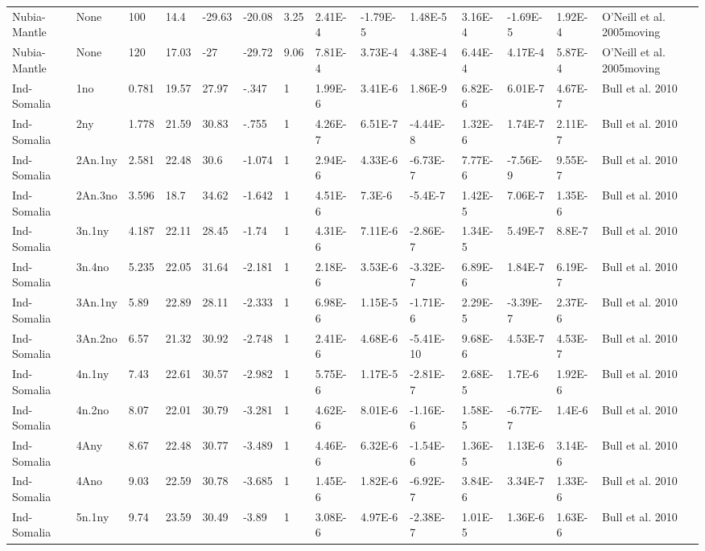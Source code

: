 \begin{landscape}
\begin{longtable}{@{}lllllllllllll>{\scriptsize}p{3.1cm}@{}}
Nubia-Mantle & None & 100 & 14.4 & -29.63 & -20.08 & 3.25 & 2.41E-4 & -1.79E-5 & 1.48E-5 & 3.16E-4 & -1.69E-5 & 1.92E-4 & O'Neill et al. 2005moving \\
Nubia-Mantle & None & 120 & 17.03 & -27 & -29.72 & 9.06 & 7.81E-4 & 3.73E-4 & 4.38E-4 & 6.44E-4 & 4.17E-4 & 5.87E-4 & O'Neill et al. 2005moving \\
Ind-Somalia & 1no & 0.781 & 19.57 & 27.97 & -.347 & 1 & 1.99E-6 & 3.41E-6 & 1.86E-9 & 6.82E-6 & 6.01E-7 & 4.67E-7 & Bull et al. 2010 \\
Ind-Somalia & 2ny & 1.778 & 21.59 & 30.83 & -.755 & 1 & 4.26E-7 & 6.51E-7 & -4.44E-8 & 1.32E-6 & 1.74E-7 & 2.11E-7 & Bull et al. 2010 \\
Ind-Somalia & 2An.1ny & 2.581 & 22.48 & 30.6 & -1.074 & 1 & 2.94E-6 & 4.33E-6 & -6.73E-7 & 7.77E-6 & -7.56E-9 & 9.55E-7 & Bull et al. 2010 \\
Ind-Somalia & 2An.3no & 3.596 & 18.7 & 34.62 & -1.642 & 1 & 4.51E-6 & 7.3E-6 & -5.4E-7 & 1.42E-5 & 7.06E-7 & 1.35E-6 & Bull et al. 2010 \\
Ind-Somalia & 3n.1ny & 4.187 & 22.11 & 28.45 & -1.74 & 1 & 4.31E-6 & 7.11E-6 & -2.86E-7 & 1.34E-5 & 5.49E-7 & 8.8E-7 & Bull et al. 2010 \\
Ind-Somalia & 3n.4no & 5.235 & 22.05 & 31.64 & -2.181 & 1 & 2.18E-6 & 3.53E-6 & -3.32E-7 & 6.89E-6 & 1.84E-7 & 6.19E-7 & Bull et al. 2010 \\
Ind-Somalia & 3An.1ny & 5.89 & 22.89 & 28.11 & -2.333 & 1 & 6.98E-6 & 1.15E-5 & -1.71E-6 & 2.29E-5 & -3.39E-7 & 2.37E-6 & Bull et al. 2010 \\
Ind-Somalia & 3An.2no & 6.57 & 21.32 & 30.92 & -2.748 & 1 & 2.41E-6 & 4.68E-6 & -5.41E-10 & 9.68E-6 & 4.53E-7 & 4.53E-7 & Bull et al. 2010 \\
Ind-Somalia & 4n.1ny & 7.43 & 22.61 & 30.57 & -2.982 & 1 & 5.75E-6 & 1.17E-5 & -2.81E-7 & 2.68E-5 & 1.7E-6 & 1.92E-6 & Bull et al. 2010 \\
Ind-Somalia & 4n.2no & 8.07 & 22.01 & 30.79 & -3.281 & 1 & 4.62E-6 & 8.01E-6 & -1.16E-6 & 1.58E-5 & -6.77E-7 & 1.4E-6 & Bull et al. 2010 \\
Ind-Somalia & 4Any & 8.67 & 22.48 & 30.77 & -3.489 & 1 & 4.46E-6 & 6.32E-6 & -1.54E-6 & 1.36E-5 & 1.13E-6 & 3.14E-6 & Bull et al. 2010 \\
Ind-Somalia & 4Ano & 9.03 & 22.59 & 30.78 & -3.685 & 1 & 1.45E-6 & 1.82E-6 & -6.92E-7 & 3.84E-6 & 3.34E-7 & 1.33E-6 & Bull et al. 2010 \\
Ind-Somalia & 5n.1ny & 9.74 & 23.59 & 30.49 & -3.89 & 1 & 3.08E-6 & 4.97E-6 & -2.38E-7 & 1.01E-5 & 1.36E-6 & 1.63E-6 & Bull et al. 2010 \\

\end{longtable}
\end{landscape}
